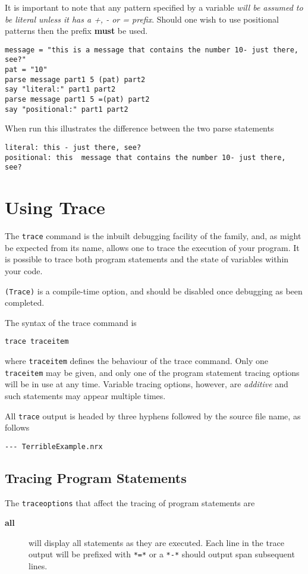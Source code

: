 {It is important to note that any pattern specified by a variable \textit{will be assumed to be literal unless it has a +, - or = prefix}. Should one wish to use positional patterns then the prefix \textbf{must} be used.
\begin{lstlisting}[label=variablePosPattern, caption=Variables in Positional Patterns]
message = "this is a message that contains the number 10- just there, see?"
pat = "10"
parse message part1 5 (pat) part2
say "literal:" part1 part2
parse message part1 5 =(pat) part2
say "positional:" part1 part2
\end{lstlisting}
When run this illustrates the difference between the two parse statements
\begin{verbatim}
literal: this - just there, see? 
positional: this  message that contains the number 10- just there, see?
\end{verbatim}
\chapter{Using Trace}
The \texttt{trace} command is the inbuilt debugging facility of the \Rexx{} family, and, as might be expected from its name, allows one to trace the execution of your program. It is possible to trace both program statements and the state of variables within your code.

\texttt{(Trace)} is a compile-time option, and should be disabled once debugging as been completed.

The syntax of the trace command is
\begin{verbatim}
trace traceitem 
\end{verbatim}
where \texttt{traceitem} defines the behaviour of the trace command. Only one \texttt{traceitem} may be given, and only one of the program statement tracing options will be in use at any time. 
Variable tracing options, however, are \textit{additive} and such statements may appear multiple times.

All \texttt{trace} output is headed by three hyphens followed by the source file name, as follows
\begin{verbatim}
--- TerribleExample.nrx
\end{verbatim}

\section{Tracing Program Statements}
The \texttt{traceoptions} that affect the tracing of program statements are
\begin{description}
\item[\textbf{all}] will display all statements as they are executed. Each line in the trace output will be prefixed with \texttt{*=*} or a \texttt{*-*} should output span subsequent lines.


\end{description}}

